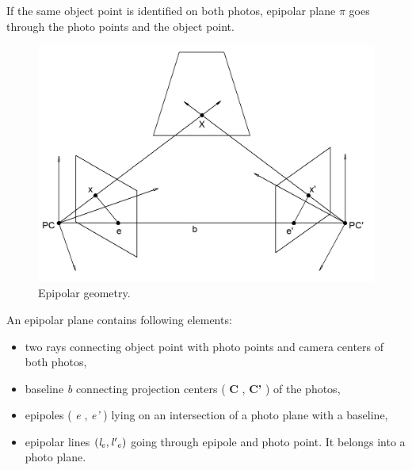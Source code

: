 \documentclass[a4paper,12pt]{article}
\newcommand{\evect}[1]{%
{\bf #1}%
}
\newcommand{\escal}[1]{%
{\it #1}%
}
\begin{document}


If the same object point is identified on both photos,  
epipolar plane $\pi$ goes through the photo points and the object point. 

\begin{figure}[h]
    \centering
    \includegraphics[scale=0.3]{figures/epipolar.png}
    \caption{Epipolar geometry.}
    \label{fig:epipolae}
\end{figure}

An epipolar plane contains following elements:


\begin{itemize}
\item two rays connecting object point with photo points and camera centers of both photos,
\item baseline \escal{b} connecting projection centers (\evect{C}, \evect{C'}) of the photos,
\item epipoles (\escal{e}, \escal{e'}) lying on an intersection of a photo plane with a baseline,
\item epipolar lines  $(\escal{l}_{e}, \escal{l'}_{e})$ going through epipole and photo point. It belongs into a photo plane.
\end{itemize}
\end{document}
